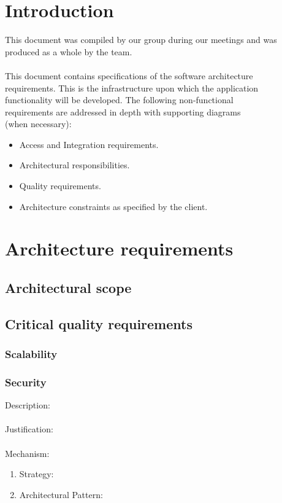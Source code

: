 \documentclass[a4paper,12pt,titlepage]{article}
\begin{document}



\newpage
\tableofcontents


\newpage
\section{Introduction}
\setlength{\voffset}{-3cm}
This document was compiled by our group during our meetings and was produced as a whole by the team.\\\\

This document contains specifications of the software architecture 
\\requirements. This is the infrastructure upon which the application
\\ functionality will be developed. The following non-functional
\\ requirements are addressed in depth with supporting diagrams
\\(when necessary):

\begin{itemize}
	\item Access and Integration requirements.
	\item Architectural responsibilities.
	\item Quality requirements.
	\item Architecture constraints as specified by the client. 
\end{itemize}

\newpage
\setlength{\voffset}{-3cm}

\section{Architecture requirements}
\subsection{Architectural scope}
\newpage
\subsection{Critical quality requirements}
\subsubsection{Scalability}%
	
\subsubsection{Security}%
	Description: \\\\
	Justification: \\\\
	Mechanism:
	\begin{enumerate}
		\item Strategy: 
		\item Architectural Pattern:
	\end{enumerate}
\end{document}
